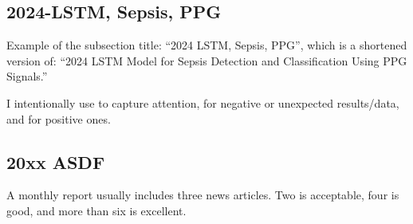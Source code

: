 

\subsection{2024-LSTM, Sepsis, PPG\cite{alvarez2024lstm}}
Example of the subsection title: ``2024 LSTM, Sepsis, PPG'', which is a shortened version of: ``2024 LSTM Model for Sepsis Detection and Classification Using PPG Signals.''


 I intentionally use  to capture attention,  for negative or unexpected results/data, and  for positive ones.

\subsection{20xx ASDF}
A monthly report usually includes three news articles. Two is acceptable, four is good, and more than six is excellent.

